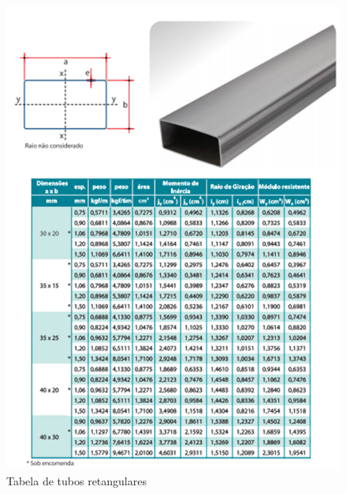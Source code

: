 \begin{anexosenv}
\begin{figure}[!ht]
	\centering
		\includegraphics[scale=0.6]{figuras/estrutura/anexos/17.png}
	\caption{Tabela de tubos retangulares}
\end{figure}


\end{anexosenv}
